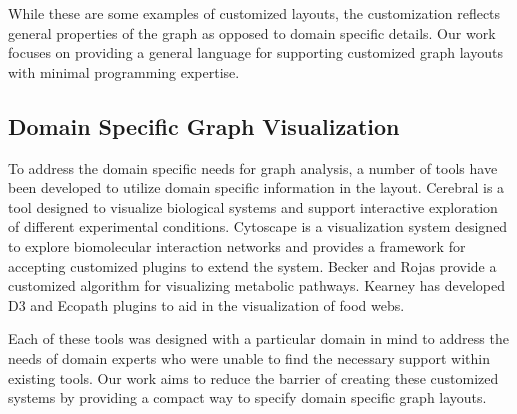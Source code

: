 While these are some examples of customized layouts, the customization reflects general properties of the graph as opposed to domain specific details. Our work focuses on providing a general language for supporting customized graph layouts with minimal programming expertise.

\subsection{Domain Specific Graph Visualization}
To address the domain specific needs for graph analysis, a number of tools have been developed to utilize domain specific information in the layout. Cerebral \cite{barsky2008cerebral} is a tool designed to visualize biological systems and support interactive exploration of different experimental conditions. Cytoscape \cite{shannon2003cytoscape} is a visualization system designed to explore biomolecular interaction networks and provides a framework for accepting customized plugins to extend the system. Becker and Rojas \cite{becker2001graph} provide a customized algorithm for visualizing metabolic pathways. Kearney has developed D3 \cite{kearney2017d3} and Ecopath \cite{kearney2017ecopath} plugins to aid in the visualization of food webs.

Each of these tools was designed with a particular domain in mind to address the needs of domain experts who were unable to find the necessary support within existing tools. Our work aims to reduce the barrier of creating these customized systems by providing a compact way to specify domain specific graph layouts.
